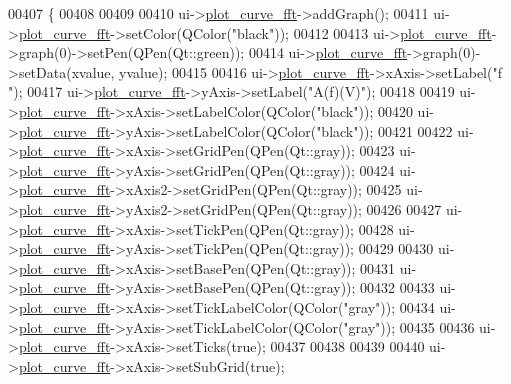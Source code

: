 \begin{DoxyCode}
00407 \{
00408 
00409 
00410   ui->\hyperlink{a00079_a2bdf46ca3b702151408e6f6bd96b3228}{plot\_curve\_fft}->addGraph();
00411   ui->\hyperlink{a00079_a2bdf46ca3b702151408e6f6bd96b3228}{plot\_curve\_fft}->setColor(QColor(\textcolor{stringliteral}{"black"}));
00412 
00413   ui->\hyperlink{a00079_a2bdf46ca3b702151408e6f6bd96b3228}{plot\_curve\_fft}->graph(0)->setPen(QPen(Qt::green));
00414   ui->\hyperlink{a00079_a2bdf46ca3b702151408e6f6bd96b3228}{plot\_curve\_fft}->graph(0)->setData(xvalue, yvalue);
00415 
00416   ui->\hyperlink{a00079_a2bdf46ca3b702151408e6f6bd96b3228}{plot\_curve\_fft}->xAxis->setLabel(\textcolor{stringliteral}{"f "});
00417   ui->\hyperlink{a00079_a2bdf46ca3b702151408e6f6bd96b3228}{plot\_curve\_fft}->yAxis->setLabel(\textcolor{stringliteral}{"A(f)(V)"});
00418 
00419   ui->\hyperlink{a00079_a2bdf46ca3b702151408e6f6bd96b3228}{plot\_curve\_fft}->xAxis->setLabelColor(QColor(\textcolor{stringliteral}{"black"}));
00420   ui->\hyperlink{a00079_a2bdf46ca3b702151408e6f6bd96b3228}{plot\_curve\_fft}->yAxis->setLabelColor(QColor(\textcolor{stringliteral}{"black"}));
00421 
00422   ui->\hyperlink{a00079_a2bdf46ca3b702151408e6f6bd96b3228}{plot\_curve\_fft}->xAxis->setGridPen(QPen(Qt::gray));
00423   ui->\hyperlink{a00079_a2bdf46ca3b702151408e6f6bd96b3228}{plot\_curve\_fft}->yAxis->setGridPen(QPen(Qt::gray));
00424   ui->\hyperlink{a00079_a2bdf46ca3b702151408e6f6bd96b3228}{plot\_curve\_fft}->xAxis2->setGridPen(QPen(Qt::gray));
00425   ui->\hyperlink{a00079_a2bdf46ca3b702151408e6f6bd96b3228}{plot\_curve\_fft}->yAxis2->setGridPen(QPen(Qt::gray));
00426 
00427   ui->\hyperlink{a00079_a2bdf46ca3b702151408e6f6bd96b3228}{plot\_curve\_fft}->xAxis->setTickPen(QPen(Qt::gray));
00428   ui->\hyperlink{a00079_a2bdf46ca3b702151408e6f6bd96b3228}{plot\_curve\_fft}->yAxis->setTickPen(QPen(Qt::gray));
00429 
00430   ui->\hyperlink{a00079_a2bdf46ca3b702151408e6f6bd96b3228}{plot\_curve\_fft}->xAxis->setBasePen(QPen(Qt::gray));
00431   ui->\hyperlink{a00079_a2bdf46ca3b702151408e6f6bd96b3228}{plot\_curve\_fft}->yAxis->setBasePen(QPen(Qt::gray));
00432 
00433   ui->\hyperlink{a00079_a2bdf46ca3b702151408e6f6bd96b3228}{plot\_curve\_fft}->xAxis->setTickLabelColor(QColor(\textcolor{stringliteral}{"gray"}));
00434   ui->\hyperlink{a00079_a2bdf46ca3b702151408e6f6bd96b3228}{plot\_curve\_fft}->yAxis->setTickLabelColor(QColor(\textcolor{stringliteral}{"gray"}));
00435 
00436   ui->\hyperlink{a00079_a2bdf46ca3b702151408e6f6bd96b3228}{plot\_curve\_fft}->xAxis->setTicks(\textcolor{keyword}{true});
00437 
00438 
00439 
00440   ui->\hyperlink{a00079_a2bdf46ca3b702151408e6f6bd96b3228}{plot\_curve\_fft}->xAxis->setSubGrid(\textcolor{keyword}{true});

\end{DoxyCode}
